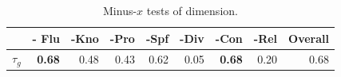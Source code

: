 
\begin{table}[ht!]
\centering
\scriptsize
\begin{tabular}{lrrrrrrrr}
\toprule
&- Flu& -Kno& -Pro& -Spf& -Div& -Con & -Rel &Overall \\ \midrule
$\tau_{g}$ &\textbf{0.68} &0.48 &0.43&0.62 &0.05 &\textbf{0.68}& 0.20&0.68   \\
\bottomrule
\end{tabular}
\caption{Minus-$x$ tests of dimension. 
}
\label{tab:minus}
\end{table}






